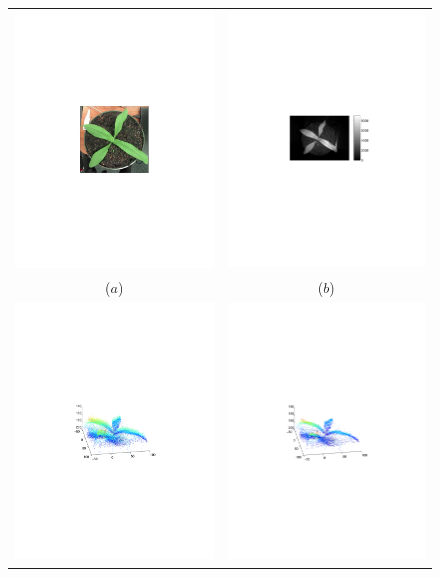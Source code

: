 \begin{figure}
\begin{center}
\begin{tabular}{ c c }
\includegraphics[trim=200 280 200 280,clip,width=0.4\linewidth]{Figures/plant1-rgb} &
\includegraphics[trim=220 270 160 280,clip,width=0.4\linewidth]{Figures/plant1-ir} \\
($a$) & ($b$) \\
\includegraphics[trim=180 270 180 280,clip,width=0.4\linewidth]{Figures/plant1-3D-single} &
\includegraphics[trim=180 270 180 280,clip,width=0.4\linewidth]{Figures/plant1-3D-average} \\

\end{tabular}
\end{center}
\end{figure}
